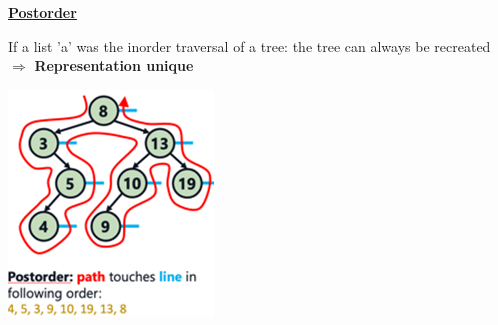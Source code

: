         {\centering\underline{\textbf{Postorder}} \par}
            \begin{minipage}{0.49\linewidth}
                
                If a list 'a' was the inorder traversal of a tree: the tree can always be recreated\\
                $\Rightarrow$ \textbf{Representation unique}
            \end{minipage}
            \begin{minipage}{0.49\linewidth}
                {\centering \includegraphics[width = 0.85\linewidth]{src/4_data_structure/images/postorder.png} \par}
            \end{minipage}



